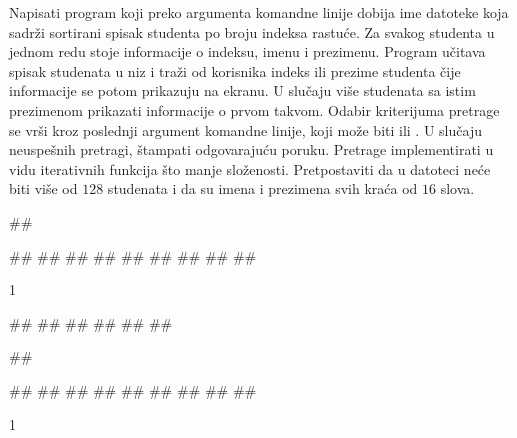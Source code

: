\begin{Answer}[ref=3_02]
\end{Answer}
\begin{Exercise}[label=3_03]
  Napisati program koji preko argumenta komandne linije dobija ime
  datoteke koja sadrži sortirani spisak studenta po broju indeksa
  rastuće. Za svakog studenta u jednom redu stoje informacije o
  indeksu, imenu i prezimenu. Program učitava spisak studenata u niz i
  traži od korisnika indeks ili prezime studenta čije informacije se
  potom prikazuju na ekranu. U slučaju više studenata sa istim
  prezimenom prikazati informacije o prvom takvom. Odabir kriterijuma
  pretrage se vrši kroz poslednji argument komandne linije, koji može
  biti  ili . U slučaju neuspešnih
  pretragi, štampati odgovarajuću poruku. Pretrage implementirati u
  vidu iterativnih funkcija što manje složenosti. Pretpostaviti da u
  datoteci neće biti više od $128$ studenata i da su imena i prezimena
  svih kraća od $16$ slova.
  
\begin{miditest}
\begin{upotreba}{1}
##
  
##
##
##
##
##
##
##
##
##
\end{upotreba}
\end{miditest}
\begin{miditest}
\begin{test2}{1}
  
  
#\naslovInt#
## 
##
##
## 
##
\end{test2}
\end{miditest}

\begin{miditest}
\begin{upotreba}{2}
##
  
##
##
##
##
##
##
##
##
##
\end{upotreba}
\end{miditest}
\begin{miditest}
\begin{test2}{1}
  

\end{test2}
\end{miditest}
\end{Exercise}
